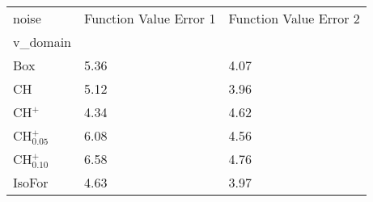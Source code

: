 \begin{tabular}{lll}
\toprule
noise & Function Value Error 1 & Function Value Error 2 \\
v_domain &  &  \\
\midrule
Box & 5.36 & 4.07 \\
CH & 5.12 & 3.96 \\
CH$^+$ & 4.34 & 4.62 \\
CH$^+_{0.05}$ & 6.08 & 4.56 \\
CH$^+_{0.10}$ & 6.58 & 4.76 \\
IsoFor & 4.63 & 3.97 \\
\bottomrule
\end{tabular}

